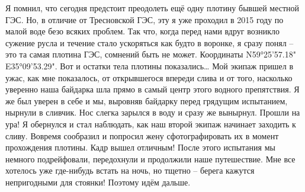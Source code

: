Я помнил, что сегодня предстоит преодолеть ещё одну плотину бывшей местной ГЭС. Но, в отличие от Тресновской ГЭС, эту я уже проходил в 2015 году по малой воде безо всяких проблем. Так что, когда перед нами вдруг возникло сужение русла и течение стало ускоряться как будто в воронке, я сразу понял – это та самая плотина ГЭС, сомнений быть не может. Координаты N59°25'57.18" E35°09'53.29". Вот и остатки тела плотины показались… Мой экипаж пришел в ужас, как мне показалось, от открывшегося впереди слива и от того, насколько уверенно наша байдарка шла прямо в самый центр этого водного препятствия. Я же был уверен в себе и мы, выровняв байдарку перед грядущим испытанием, нырнули в сливчик. Нос слегка зарылся в воду и сразу же вынырнул. Прошли на ура! Я обернулся и стал наблюдать, как наш второй экипаж начинает заходить к сливу. Вовремя сообразил и попросил жену сфотографировать их в момент прохождения плотины. Кадр вышел отличным!
После этого испытания мы немного подрейфовали, передохнули и продолжили наше путешествие. Мне все хотелось уже где-нибудь встать на ночь, но тщетно – берега кажутся непригодными для стоянки! Поэтому идём дальше.
